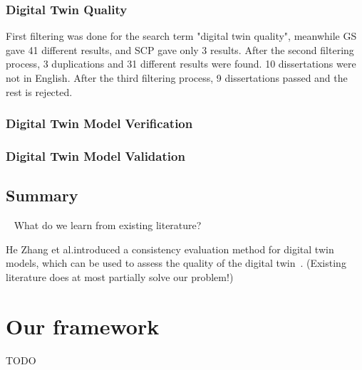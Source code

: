 \documentclass[9pt,conference]{IEEEtran}
\begin{document}
    \subsubsection*{Digital Twin Quality}
    \label{subsection:DigitalTwinQuality}
    First filtering was done for the search term "digital twin quality", meanwhile GS gave 41 different results, and SCP gave only 3 results.
    After the second filtering process, 3 duplications and 31 different results were found. 10 dissertations were not in English.
    After the third filtering process, 9 dissertations passed and the rest is rejected.

    \subsubsection*{Digital Twin Model Verification}
    \label{subsection:DigitalTwinVerification}

    \subsubsection*{Digital Twin Model Validation}
    \label{subsection:DigitalTwinValidation}

    \subsection{Summary}~\label{section:liteature_summary}
    What do we learn from existing literature?

    He Zhang et al.introduced a consistency evaluation method for digital twin models, which can be used to assess the quality of the digital twin~\cite{ConsistencyEvolutionMethodForDigitalTwins}.
    (Existing literature does at most partially solve our problem!)

    \section{Our framework}
    \label{section:framework_1}
    TODO
\end{document}

